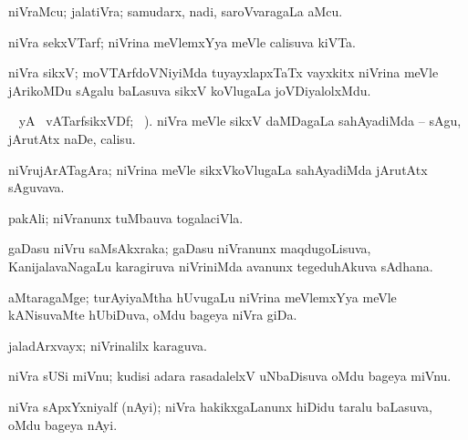 \bentry
{} 
\gl{\nA}
\expl{}
\bmng
niVraMcu; jalatiVra; samudarx, nadi, saroVvaragaLa aMcu. 
\emng
\eentry

\bentry
{} 
\gl{\nA}
\expl{}
\bmng
niVra sekxVTarf; niVrina meVlemxYya meVle calisuva kiVTa. 
\emng
\eentry

\bentry
{} 
\gl{\nA}
\bmng
niVra sikxV; moVTArfdoVNiyiMda tuyayxlapxTaTx vayxkitx niVrina meVle jArikoMDu sAgalu baLasuva sikxV koVlugaLa joVDiyalolxMdu. 
\emng
\eentry

\bentry
{} 
\gl{\akirx}
 \BUkaq\  yA  \ucAcx\ vATarfsikxVDf; \vakaq\ ).\bmng
niVra meVle sikxV daMDagaLa sahAyadiMda -- sAgu, jArutAtx naDe, calisu. 
\emng
\eentry

\bentry
{} 
\gl{\nA}
\expl{}
\bmng
niVrujArATagAra; niVrina meVle sikxVkoVlugaLa sahAyadiMda jArutAtx sAguvava. 
\emng
\eentry

\bentry
{} 
\gl{\nA}
\expl{}
\bmng
pakAli; niVranunx tuMbauva togalaciVla. 
\emng
\eentry

\bentry
{} 
\gl{\nA}
\expl{}
\bmng
gaDasu niVru saMsAkxraka; gaDasu niVranunx maqdugoLisuva, KanijalavaNagaLu karagiruva niVriniMda avanunx tegeduhAkuva sAdhana. 
\emng
\eentry

\bentry
{} 
\gl{\nA}
\expl{}
\bmng
aMtaragaMge; turAyiyaMtha hUvugaLu niVrina meVlemxYya meVle kANisuvaMte hUbiDuva, oMdu bageya niVra giDa. 
\emng
\eentry

\bentry
{} 
\gl{\gu}
\expl{}
\bmng
jaladArxvayx; niVrinalilx karaguva. 
\emng
\eentry

\bentry
{} 
\gl{\nA}
\expl{}
\bmng
niVra sUSi miVnu; kudisi adara rasadalelxV uNbaDisuva oMdu bageya miVnu. 
\emng
\eentry

\bentry
{} 
\gl{\nA}
\expl{}
\bmng
niVra sApxYxniyalf (nAyi); niVra hakikxgaLanunx hiDidu taralu baLasuva, oMdu bageya nAyi.  
\emng
\eentry

